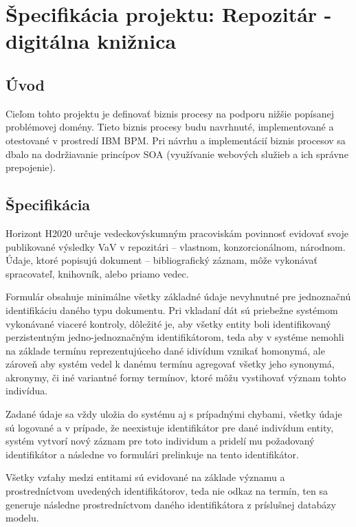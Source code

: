 \documentclass[10pt,oneside,slovak,a4paper]{article}
\begin{document}
\newpage

\section{Špecifikácia projektu: Repozitár - digitálna knižnica}

\subsection{Úvod}

Cieľom tohto projektu je definovať biznis procesy na podporu nižšie popísanej problémovej domény. Tieto biznis procesy budu navrhnuté, implementované a otestované v prostredí IBM BPM. Pri návrhu a implementácií biznis procesov sa dbalo na dodržiavanie princípov SOA (využívanie webových služieb a ich správne prepojenie).


\subsection{Špecifikácia}

Horizont H2020 určuje vedeckovýskumným pracoviskám povinnosť evidovať svoje publikované výsledky VaV v repozitári – vlastnom, konzorcionálnom, národnom. Údaje, ktoré popisujú dokument – bibliografický záznam, môže vykonávať spracovateľ, knihovník, alebo priamo vedec.

Formulár obsahuje minimálne všetky základné údaje nevyhnutné pre jednoznačnú identifikáciu daného typu dokumentu. Pri vkladaní dát sú priebežne systémom vykonávané viaceré kontroly, dôležité je, aby všetky entity boli identifikovaný perzistentným jedno-jednoznačným identifikátorom, teda aby v systéme nemohli na základe termínu reprezentujúceho dané idivídum vznikať homonymá, ale zároveň aby systém vedel k danému termínu agregovať všetky jeho synonymá, akronymy, či iné variantné formy termínov, ktoré môžu vystihovať význam tohto indivídua.

Zadané údaje sa vždy uložia do systému aj s prípadnými chybami, všetky údaje sú logované a v prípade, že neexistuje identifikátor pre dané indivídum entity, systém vytvorí nový záznam pre toto individum a pridelí mu požadovaný identifikátor a následne vo formulári prelinkuje na tento identifikátor.

Všetky vzťahy medzi entitami sú evidované na základe významu a prostredníctvom uvedených identifikátorov, teda nie odkaz na termín, ten sa generuje následne prostredníctvom daného identifikátora z príslušnej databázy modelu. 
\end{document}
